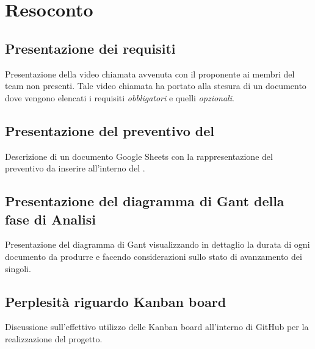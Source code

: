 \section{Resoconto}

\subsection{Presentazione dei requisiti}
Presentazione della video chiamata avvenuta con il proponente \Proponente{} ai membri del team non presenti. Tale video chiamata ha portato alla stesura di un documento dove vengono elencati i requisiti \textit{obbligatori} e quelli \textit{opzionali}.

\subsection{Presentazione del preventivo del \PdP}
Descrizione di un documento Google Sheets con la rappresentazione del preventivo da inserire all'interno del \PdP{}.

\subsection{Presentazione del diagramma di Gant della fase di Analisi}
Presentazione del diagramma di Gant visualizzando in dettaglio la durata di ogni documento da produrre e facendo considerazioni sullo stato di avanzamento dei singoli.

\subsection{Perplesità riguardo Kanban board}
Discussione sull'effettivo utilizzo delle Kanban board all'interno di GitHub per la realizzazione del progetto.
